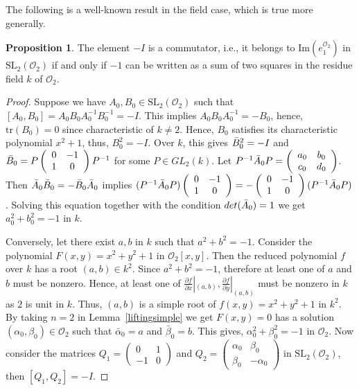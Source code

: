 \documentclass[10pt,twoside]{amsart}
\newcommand{\SL}{\mathrm{SL}}
\newcommand{\tr}{\mathrm{tr}}
\newcommand{\im}{\mathrm{Im}}
\newcommand{\R}{\mathcal{O}_2}
\theoremstyle{definition}
\theoremstyle{definition}
\newtheorem{proposition}[theorem]{Proposition}
\begin{document}
The following is a well-known result in the field case, which is true more generally. 
\begin{proposition}{\label{minus Id}}
The element $-I$ is a commutator, i.e., it belongs to $\im(e_1^{\R})$ in $\SL_2(\R)$ if and only if $-1$ can be written as a sum of two squares in the residue field $k$ of $\R$.
\end{proposition}
\begin{proof}
Suppose we have $A_0, B_0\in \SL_2(\R)$ such that $[A_0, B_0]= A_0B_0A_0^{-1}B_0^{-1} =-I$. This implies $A_0B_0A_0^{-1}=-B_0$, hence, $\tr(B_0) = 0$ since characteristic of $k\neq 2$. Hence, $B_0$ satisfies its characteristic polynomial $x^2 + 1$, thus, $B_0^2 = -I$. Over $k$, this gives $\Bar{B}_0^2 = -I$ and $\Bar{B}_0 = P \left(\begin{array}{cc}  0 & -1 \\ 1  & 0 \end{array}\right)P^{-1}$ for some $P\in GL_2(k)$. Let $P^{-1}\Bar{A}_0P= \left(\begin{array}{cc}  a_0 & b_0 \\  c_0  & d_0
\end{array}\right)$. Then $\Bar{A}_0 \Bar{B}_0 = -\Bar{B}_0 \Bar{A}_0$ implies $(P^{-1}\Bar{A}_0P)\left(\begin{array}{cc}
    0 & -1 \\
   1  & 0
\end{array}\right)=-\left(\begin{array}{cc}
    0 & -1 \\
   1  & 0
\end{array}\right)(P^{-1}\Bar{A}_0P)$. Solving this equation together with the condition $det(\Bar{A}_0)=1$ we get $a_0^2 + b_0^2 = -1$ in $k$. 

Conversely, let there exist $a, b$ in $k$ such that $a^2 + b^2 = -1$. Consider the polynomial $F(x, y)= x^2 + y^2 + 1$ in $ \R[x,y]$. Then the reduced polynomial $f$ over $k$ has a root $(a, b) \in k^2$. Since $a^2+ b^2 = -1$, therefore at least one of $ a$ and $ b$ must be nonzero. Hence, at least one of $\frac{\partial f}{\partial x}|_{(a,b)}, \frac{\partial f}{\partial y}|_{(a,b)}$ must be nonzero in $k$ as $2$ is unit in $k$. Thus, $(a, b)$ is a simple root of $f(x, y) = x^2 + y^2 + 1$ in $k^2$. By taking $n=2$ in Lemma~\ref{liftingsimple} we get $F(x, y) = 0$ has a solution $(\alpha_0, \beta_0) \in \R$ such that $\bar{\alpha}_0 = a$ and $\bar{\beta}_0 = b$. This gives, $\alpha_0^2 + \beta_0^2 = -1$ in $\R$. Now consider the matrices $Q_1=\left(\begin{array}{cc} 0 &  1\\ -1 & 0 \end{array}\right)$ and $Q_2 = \left(\begin{array}{cc} \alpha_0 &  \beta_0\\
\beta_0 & -\alpha_0 \end{array}\right)$ in $\SL_2(\R)$, then $[Q_1, Q_2] = -I$.
\end{proof}
\end{document}

